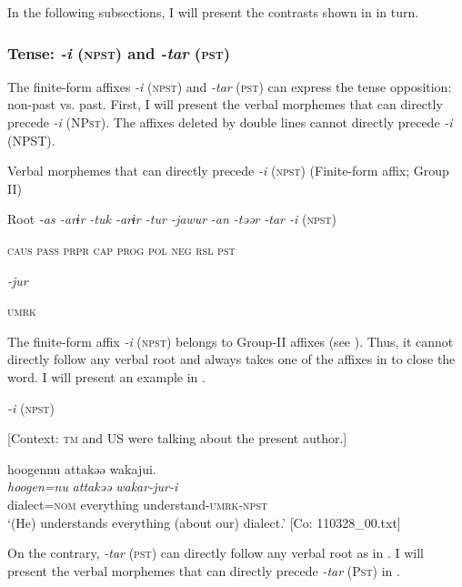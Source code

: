 In the following subsections, I will present the contrasts shown in  in turn.

\subsubsection{Tense: \textit{-i} (\textsc{npst}) and \textit{-tar} (\textsc{pst})}

The finite-form affixes \textit{-i} (\textsc{npst}) and \textit{-tar} (\textsc{pst}) can express the tense opposition: non-past vs. past. First, I will present the verbal morphemes that can directly precede \textit{-i} (NP\textsc{st}). The affixes deleted by double lines cannot directly precede \textit{-i} (NPST).

\ea\label{ex:8-53}
  Verbal morphemes that can directly precede \textit{-i} (\textsc{npst}) (Finite-form affix; Group II)

  Root  \textit{-as  -arɨr} %
\textit{-tuk  -arɨr  -tur  -jawur} %
\textit{-an  -təər  -tar  -i} (\textsc{npst})

    \textsc{caus}  \textsc{pass}  \textsc{prpr}  \textsc{cap}  \textsc{prog}  \textsc{pol}  \textsc{neg}  \textsc{rsl}  \textsc{pst}

          \textit{-jur}

          \textsc{umrk}
\z

The finite-form affix \textit{-i} (\textsc{npst}) belongs to Group-II affixes (see ). Thus, it cannot directly follow any verbal root and always takes one of the affixes in  to close the word. I will present an example in .

\ea\label{ex:8-54}
  \textit{-i} (\textsc{npst})

  [Context: \textsc{tm} and US were talking about the present author.]

  {\TM}
\glll  {\textbar}hoogen{\textbar}nu  attakəə  wakajui.\\
\textit{hoogen=nu}  \textit{attakəə}  \textit{wakar-jur-i}\\
    dialect=\textsc{nom}  everything  understand-\textsc{umrk}-\textsc{npst}\\
\glt ‘(He) understands everything (about our) dialect.’ [Co: 110328\_00.txt]
\z

  On the contrary, \textit{-tar} (\textsc{pst}) can directly follow any verbal root as in . I will present the verbal morphemes that can directly precede \textit{-tar} (P\textsc{st}) in .

